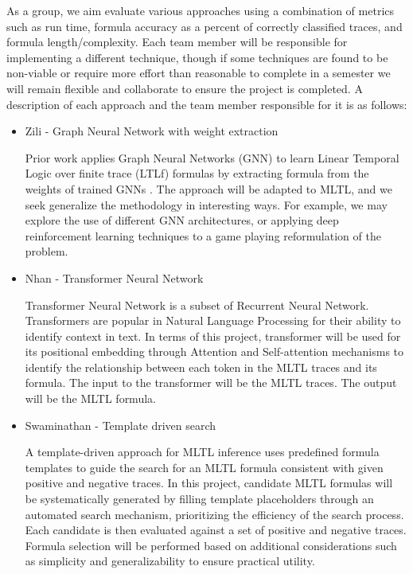 \documentclass[12pt]{article}
\begin{document}
As a group, we aim evaluate various approaches using a combination of metrics such as run time, formula accuracy as a percent of correctly classified traces, and formula length/complexity.  
Each team member will be responsible for implementing a different technique, though if some techniques are found to be non-viable or require more effort than reasonable to complete in a semester we will remain flexible and collaborate to ensure the project is completed.
A description of each approach and the team member responsible for it is as follows:
\begin{itemize}
  \item Zili - Graph Neural Network with weight extraction
  
  Prior work applies Graph Neural Networks (GNN) to learn Linear Temporal Logic over finite trace (LTLf) formulas by extracting formula from the weights of trained GNNs \cite{Luo_Liang_Du_Wan_Peng_Zhang_2022}.
  The approach will be adapted to MLTL, and we seek generalize the methodology in interesting ways. 
  For example, we may explore the use of different GNN architectures, or applying deep reinforcement learning techniques to a game playing reformulation of the problem. 

  \item Nhan - Transformer Neural Network
	
	Transformer Neural Network is a subset of Recurrent Neural Network. Transformers are popular in Natural Language Processing for their ability to identify context in text. In terms of this project, transformer will be used for its positional embedding through Attention and Self-attention mechanisms to identify the relationship between each token in the MLTL traces and its formula. The input to the transformer will be the MLTL traces. The output will be the MLTL formula.
    
	\item Swaminathan - Template driven search
	
  A template-driven approach for MLTL inference uses predefined formula templates to guide the search for an MLTL formula consistent with given positive and negative traces. In this project, candidate MLTL formulas will be systematically generated by filling template placeholders through an automated search mechanism, prioritizing the efficiency of the search process. Each candidate is then evaluated against a set of positive and negative traces. Formula selection will be performed based on additional considerations such as simplicity and generalizability to ensure practical utility.


\end{itemize}
\end{document}
